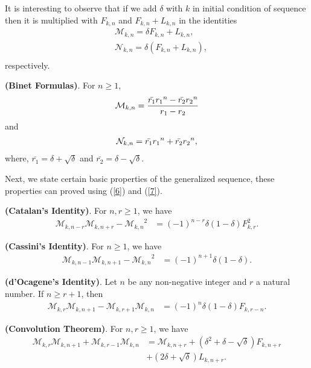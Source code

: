 \noindent It is interesting to observe that if we add $\delta$ with $k$ in initial condition of sequence \M\vspace{.5mm} then it is multiplied with $F_{k,n}$ and $F_{k,n}+L_{k,n}$ in the identities
\begin{align*}
\quad\mathcal{M}_{k,n}=\delta F_{k,n}+L_{k,n},\\
\quad\mathcal{N}_{k,n}=\delta\left( F_{k,n}+L_{k,n}\right),\\
\end{align*}
respectively.
\begin{theorem}\textbf{(Binet Formulas)}. For $n\geq{1}$, 
\begin{align}\label{6} 
\m_{k,n}= \dfrac{\bar{r_{1}}{r_{1}}^n-\bar{r_{2}}{r_{2}}^n}{r_1-r_2}
\end{align}
and
\begin{align}\label{7} 
\n_{k,n}= \bar{r_{1}}{r_{1}}^n + \bar{r_{2}}{r_{2}}^n,
\end{align}
where, $\bar{r_{1}}=\delta+\sqrt{\delta}$ and $\bar{r_{2}}=\delta-\sqrt{\delta}$.
\end{theorem}
\noindent Next, we state certain basic properties of the generalized \kL\vspace{.5mm} sequence, these properties can proved using (\ref{6}) and (\ref{7}).
\begin{theorem}\textbf{(Catalan's Identity)}. For $n, r\geq{1}$, we have
\begin{align*}
\mathcal{M}_{k,n-r}\mathcal{M}_{k,n+r}-{\mathcal{M}_{k,n}}^2&={(-1)}^{n-r}{\delta(1-\delta)F_{k,r}^2}.
\end{align*}
\end{theorem}
\begin{theorem}\textbf{(Cassini's Identity)}. For $n\geq{1}$, we have
\begin{align*}
\mathcal{M}_{k,n-1}\mathcal{M}_{k,n+1}-{\mathcal{M}_{k,n}}^2&={(-1)}^{n+1}{\delta(1-\delta)}.
\end{align*}
\end{theorem}
\begin{theorem}\textbf{(d'Ocagene's Identity)}. Let $n$ be any non-negative integer and $r$ a natural number. If $n\geq {r+1}$, then
\begin{align*}
\mathcal{M}_{k,r}\mathcal{M}_{k,n+1}-\mathcal{M}_{k,r+1}\mathcal{M}_{k,n}&=(-1)^n \delta(1-\delta) F_{k,r-n}.
\end{align*}
\end{theorem}
\begin{theorem}\textbf{(Convolution Theorem)}. For $n,r\geq{1}$, we have
\begin{align*}
\mathcal{M}_{k,r} \mathcal{M}_{k,n+1} + \mathcal{M}_{k,r-1}\mathcal{M}_{k,n}& = \mathcal{M}_{k,n+r} + ({\delta}^2+\delta-\sqrt{\delta})F_{k,n+r}\\&+(2\delta+\sqrt{\delta})L_{k,n+r}.
\end{align*}
\end{theorem}
